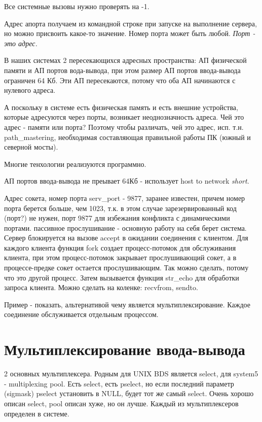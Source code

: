 \documentclass[12pt,a4paper]{scrreprt}
\begin{document}
Все системные вызовы нужно проверять на -1.

Адрес апорта получаем из командной строке при запуске на выполнение сервера, но можно присвоить какое-то значение. Номер порта может быть любой. \textit{Порт - это адрес.} 

В наших системах 2 пересекающихся адресных пространства: АП физической памяти и АП портов вода-вывода, при этом размер АП портов ввода-вывода ограничен 64 Кб. Эти АП пересекаются, потому что оба АП начинаются с нулевого адреса. 

А поскольку в системе есть физическая память и есть внешние устройства, которые адресуются через порты, возникает неоднозначность адреса. Чей это адрес - памяти или порта? Поэтому чтобы различать, чей это адрес, исп. т.н. path\_mastering, необходимая составляющая правильной работы ПК (южный и северной мосты).

Многие тенхологии реализуются программно.

АП портов ввода-вывода не преывает 64Кб - использует host to network \textit{short}.

Адрес сокета, номер порта serv\_port - 9877, заранее известен, причем номер порта берется больше, чем 1023, т.к. в этом случае зарезервированный код (порт?) не нужен, порт 9877 для избежания конфликта с динамическими портами. пассивное прослушивание - основную работу на себя берет система. Сервер блокируется на вызове accept в ожидании соединения с клиентом. Для каждого клиента функция fork создает процесс-потомок для обслуживания клиента, при этом процесс-потомок закрывает прослушивающий сокет, а в процессе-предке сокет остается прослушивающим. Так можно сделать, потому что это другой процесс. Затем вызывается функция str\_echo для обработки запроса клиента. Можно сделать на коленке: recvfrom, sendto.

Пример - показать, альтернативой чему является мультиплексирование. Каждое соединение обслуживается отдельным процессом.

\section{Мультиплексирование ввода-вывода}

2 основных мультиплексера. Родным для UNIX BDS является select, для system5 - multiplexing pool. Есть select, есть pselect, но если последний параметр (sigmask) pselect установить в NULL, будет тот же самый select. Очень хорошо описан select, pool описан хуже, но он лучше. Каждый из мультиплексеров определен в системе.
\end{document}
